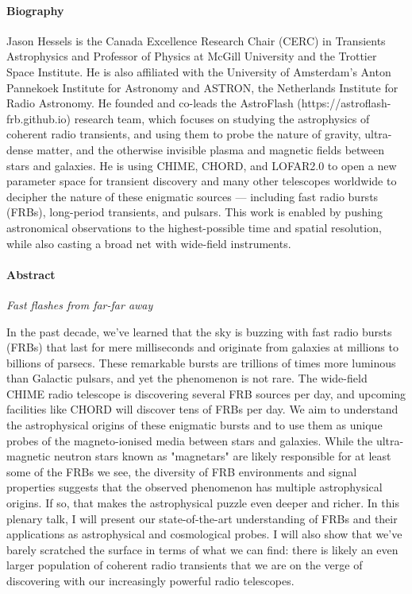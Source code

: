 \paragraph{Biography}
{\sffamily
Jason Hessels is the Canada Excellence Research Chair (CERC) in Transients Astrophysics and Professor of Physics at McGill University and the Trottier Space Institute. He is also affiliated with the University of Amsterdam's Anton Pannekoek Institute for Astronomy and ASTRON, the Netherlands Institute for Radio Astronomy. He founded and co-leads the AstroFlash (https://astroflash-frb.github.io) research team, which focuses on studying the astrophysics of coherent radio transients, and using them to probe the nature of gravity, ultra-dense matter, and the otherwise invisible plasma and magnetic fields between stars and galaxies. He is using CHIME, CHORD, and LOFAR2.0 to open a new parameter space for transient discovery and many other telescopes worldwide to decipher the nature of these enigmatic sources --- including fast radio bursts (FRBs), long-period transients, and pulsars. This work is enabled by pushing astronomical observations to the highest-possible time and spatial resolution, while also casting a broad net with wide-field instruments.
}

\paragraph{Abstract}
{\itshape
Fast flashes from far-far away

In the past decade, we've learned that the sky is buzzing with fast radio bursts (FRBs) that last for mere milliseconds and originate from galaxies at millions to billions of parsecs. These remarkable bursts are trillions of times more luminous than Galactic pulsars, and yet the phenomenon is not rare. The wide-field CHIME radio telescope is discovering several FRB sources per day, and upcoming facilities like CHORD will discover tens of FRBs per day. We aim to understand the astrophysical origins of these enigmatic bursts and to use them as unique probes of the magneto-ionised media between stars and galaxies. While the ultra-magnetic neutron stars known as "magnetars" are likely responsible for at least some of the FRBs we see, the diversity of FRB environments and signal properties suggests that the observed phenomenon has multiple astrophysical origins. If so, that makes the astrophysical puzzle even deeper and richer. In this plenary talk, I will present our state-of-the-art understanding of FRBs and their applications as astrophysical and cosmological probes. I will also show that we've barely scratched the surface in terms of what we can find: there is likely an even larger population of coherent radio transients that we are on the verge of discovering with our increasingly powerful radio telescopes.
}

